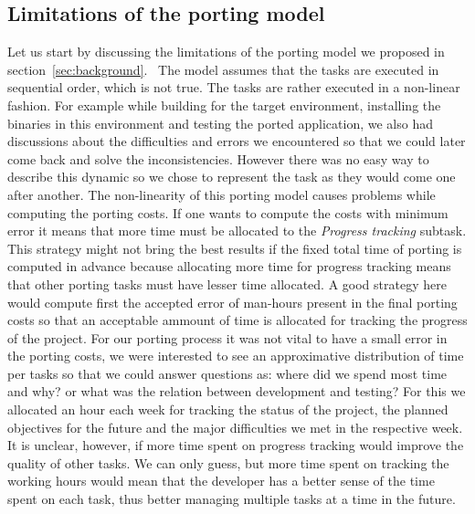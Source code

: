 \subsection{Limitations of the porting model}

Let us start by discussing the limitations of the porting model we proposed in
section~\ref{sec:background}.~ The model assumes that the tasks are executed in
sequential order, which is not true. The tasks are rather executed in a
non-linear fashion. For example while building for the target environment,
installing the binaries in this environment and testing the ported application,
we also had discussions about the difficulties and errors we encountered so that
we could later come back and solve the inconsistencies. However there was no
easy way to describe this dynamic so we chose to represent the task as they
would come one after another. The non-linearity of this porting model causes
problems while computing the porting costs. If one wants to compute the costs
with minimum error it means that more time must be allocated to the
\textit{Progress tracking} subtask. This strategy might not bring the best
results if the fixed total time of porting is computed in advance because
allocating more time for progress tracking means that other porting tasks must
have lesser time allocated. A good strategy here would compute first the
accepted error of man-hours present in the final porting costs so that an
acceptable ammount of time is allocated for tracking the progress of the
project. For our porting process it was not vital to have a small error in the
porting costs, we were interested to see an approximative distribution of time
per tasks so that we could answer questions as: where did we spend most time and
why? or what was the relation between development and testing? For this we
allocated an hour each week for tracking the status of the project, the planned
objectives for the future and the major difficulties we met in the respective
week. It is unclear, however, if more time spent on progress tracking would
improve the quality of other tasks. We can only guess, but more time spent on
tracking the working hours would mean that the developer has a better sense of
the time spent on each task, thus better managing multiple tasks at a time in
the future.

